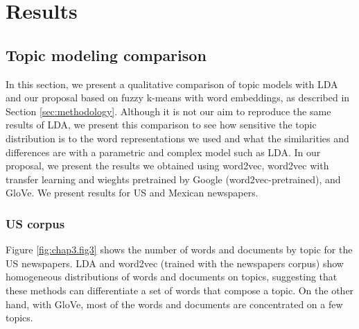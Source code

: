 \documentclass{article}
\begin{document}
\section{Results}
\label{sec:results}

\subsection{Topic modeling comparison}

In this section, we present a qualitative comparison of topic models with LDA and our proposal based on fuzzy k-means with word embeddings, as described in Section \ref{sec:methodology}. Although it is not our aim to reproduce the same results of LDA, we present this comparison to see how sensitive  the topic distribution is to the word representations we used and what the similarities and differences are with a parametric and complex model such as LDA. In our proposal, we present the results we obtained using word2vec, word2vec with transfer learning and wieghts pretrained by Google (word2vec-pretrained), and GloVe. We present results for US and Mexican newspapers. 

\subsubsection{US corpus}
\label{sec:topic_uscorpus}

Figure \ref{fig:chap3.fig3} shows the number of words and documents by topic for the US newspapers.  LDA and word2vec (trained with the newspapers corpus) show homogeneous distributions of words and documents on topics, suggesting that these methods can differentiate  a set of words that compose a topic. On the other hand,  with GloVe, most of the words and documents are concentrated on a few topics.
\end{document}
